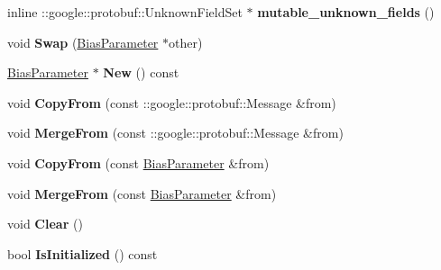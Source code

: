 \begin{DoxyCompactItemize}
\item 
\mbox{\label{classcaffe_1_1_bias_parameter_a689873f6f07e5a658a796eb6e7b74c38}} 
inline \+::google\+::protobuf\+::\+Unknown\+Field\+Set $\ast$ {\bfseries mutable\+\_\+unknown\+\_\+fields} ()
\item 
\mbox{\label{classcaffe_1_1_bias_parameter_a0e47892a65aab68aaaa7657b087ca2d4}} 
void {\bfseries Swap} (\mbox{\hyperlink{classcaffe_1_1_bias_parameter}{Bias\+Parameter}} $\ast$other)
\item 
\mbox{\label{classcaffe_1_1_bias_parameter_aac7781148f1916ada6b007f995680335}} 
\mbox{\hyperlink{classcaffe_1_1_bias_parameter}{Bias\+Parameter}} $\ast$ {\bfseries New} () const
\item 
\mbox{\label{classcaffe_1_1_bias_parameter_a4a0b95147e2656777dd50efb2cd91498}} 
void {\bfseries Copy\+From} (const \+::google\+::protobuf\+::\+Message \&from)
\item 
\mbox{\label{classcaffe_1_1_bias_parameter_afda8591a53c51b737ee0085952ccdd23}} 
void {\bfseries Merge\+From} (const \+::google\+::protobuf\+::\+Message \&from)
\item 
\mbox{\label{classcaffe_1_1_bias_parameter_a9b2cc6323b7e85818c6a84e5c0b25f32}} 
void {\bfseries Copy\+From} (const \mbox{\hyperlink{classcaffe_1_1_bias_parameter}{Bias\+Parameter}} \&from)
\item 
\mbox{\label{classcaffe_1_1_bias_parameter_a1dd19981d9b749ccf54f3f6add8fc85e}} 
void {\bfseries Merge\+From} (const \mbox{\hyperlink{classcaffe_1_1_bias_parameter}{Bias\+Parameter}} \&from)
\item 
\mbox{\label{classcaffe_1_1_bias_parameter_a63ee46aa9cca86ce53a1e84ef1b9c47c}} 
void {\bfseries Clear} ()
\item 
\mbox{\label{classcaffe_1_1_bias_parameter_aaba27851350dfd93697d0f6d2d845b30}} 
bool {\bfseries Is\+Initialized} () const
\item 

\end{DoxyCompactItemize}

